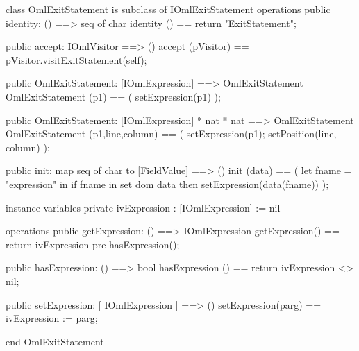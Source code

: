 \begin{vdm_al}
class OmlExitStatement is subclass of IOmlExitStatement
operations
  public identity: () ==> seq of char
  identity () == return "ExitStatement";

  public accept: IOmlVisitor ==> ()
  accept (pVisitor) == pVisitor.visitExitStatement(self);

  public OmlExitStatement:
    [IOmlExpression] ==> OmlExitStatement
  OmlExitStatement (p1) == 
    ( setExpression(p1) );

  public OmlExitStatement:
    [IOmlExpression] *
    nat *
    nat ==> OmlExitStatement
  OmlExitStatement (p1,line,column) == 
    ( setExpression(p1);
      setPosition(line, column) );

  public init: map seq of char to [FieldValue] ==> ()
  init (data) ==
    ( let fname = "expression" in
        if fname in set dom data
        then setExpression(data(fname)) );

instance variables
  private ivExpression : [IOmlExpression] := nil

operations
  public getExpression: () ==> IOmlExpression
  getExpression() == return ivExpression
    pre hasExpression();

  public hasExpression: () ==> bool
  hasExpression () == return ivExpression <> nil;

  public setExpression: [ IOmlExpression ] ==> ()
  setExpression(parg) == ivExpression := parg;

end OmlExitStatement
\end{vdm_al}

